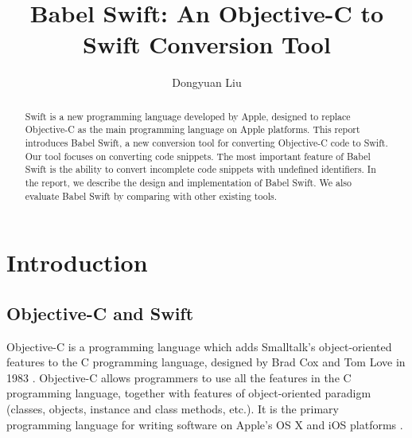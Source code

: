 \documentclass{sfuthesis}
\title{Babel Swift: An Objective-C to Swift Conversion Tool}
\author{Dongyuan Liu}
\begin{document}
\frontmatter
\maketitle{}
\makecommittee{}

\begin{abstract}
Swift is a new programming language developed by Apple, designed to replace Objective-C as the main programming language on Apple platforms. This report introduces Babel Swift, a new conversion tool for converting Objective-C code to Swift. Our tool focuses on converting code snippets. The most important feature of Babel Swift is the ability to convert incomplete code snippets with undefined identifiers. In the report, we describe the design and implementation of Babel Swift. We also evaluate Babel Swift by comparing with other existing tools.
\end{abstract}





\tableofcontents\clearpage
{}\listoftables\clearpage
{}\listoffigures\clearpage
{}\listoflistings





%
%

\mainmatter%

\chapter{Introduction}

\section{Objective-C and Swift}

Objective-C is a programming language which adds Smalltalk's object-oriented features to the C programming language, designed by Brad Cox and Tom Love in 1983 \cite{cox1983object}. Objective-C allows programmers to use all the features in the C programming language, together with features of object-oriented paradigm (classes, objects, instance and class methods, etc.). It is the primary programming language for writing software on Apple's OS X and iOS platforms \cite{aboutobjc}.
\end{document}
